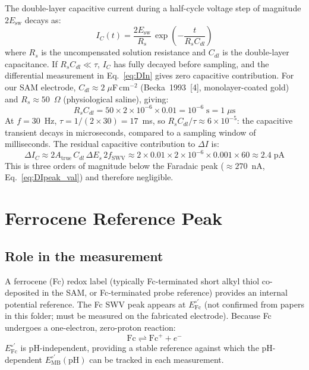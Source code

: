 \documentclass[10pt,a4paper]{article}
\numberwithin{equation}{section}
\newcommand{\cit}[1]{[#1]}
\newcommand{\Eo}{E^{\circ\prime}}
\newcommand{\DI}{\Delta I}
\newcommand{\Esw}{E_{\text{sw}}}
\newcommand{\Des}{\Delta E_s}
\begin{document}
The double-layer capacitive current during a half-cycle voltage step
of magnitude $2\Esw$ decays as:
\begin{equation}
  I_C(t) = \frac{2\Esw}{R_s}\,\exp\!\!\left(-\frac{t}{R_s C_{dl}}\right)
  \label{eq:IC}
\end{equation}
where $R_s$ is the uncompensated solution resistance and $C_{dl}$ is
the double-layer capacitance. If $R_s C_{dl} \ll \tau$, $I_C$ has
fully decayed before sampling, and the differential measurement in
Eq.~\eqref{eq:DIn} gives zero capacitive contribution. For our SAM
electrode, $C_{dl} \approx 2\;\mu$F\,cm$^{-2}$ (Becka~1993~\cit{4},
monolayer-coated gold) and $R_s \approx 50$~$\Omega$ (physiological
saline), giving:
\begin{equation}
  R_s C_{dl} = 50 \times 2\times10^{-6} \times 0.01
  = 10^{-6}\;\text{s} = 1\;\mu\text{s}
  \label{eq:RSCD}
\end{equation}
At $f = 30$~Hz, $\tau = 1/(2\times30) = 17$~ms, so
$R_s C_{dl}/\tau \approx 6\times10^{-5}$: the capacitive transient
decays in microseconds, compared to a sampling window of milliseconds.
The residual capacitive contribution to $\DI$ is:
\begin{equation}
  \DI_C \approx 2 A_{\text{true}}\,C_{dl}\,\Des\,2f_{\text{SWV}}
  \approx 2 \times 0.01 \times 2\times10^{-6} \times 0.001 \times 60
  \approx 2.4\;\text{pA}
  \label{eq:DIC}
\end{equation}
This is three orders of magnitude below the Faradaic peak
($\approx 270$~nA, Eq.~\ref{eq:DIpeak_val}) and therefore negligible.

\section{Ferrocene Reference Peak}
\label{sec:fc}

\subsection{Role in the measurement}

A ferrocene (Fc) redox label (typically Fc-terminated short alkyl
thiol co-deposited in the SAM, or Fc-terminated probe reference)
provides an internal potential reference. The Fc SWV peak appears at
$\Eo_{\text{Fc}}$ (not confirmed from papers in this folder; must be
measured on the fabricated electrode). Because Fc undergoes a
one-electron, zero-proton reaction:
\begin{equation}
  \text{Fc} \rightleftharpoons \text{Fc}^+ + e^-
  \label{eq:Fc}
\end{equation}
$\Eo_{\text{Fc}}$ is pH-independent, providing a stable reference
against which the pH-dependent $\Eo_{\text{MB}}(\text{pH})$ can be
tracked in each measurement.
\end{document}
